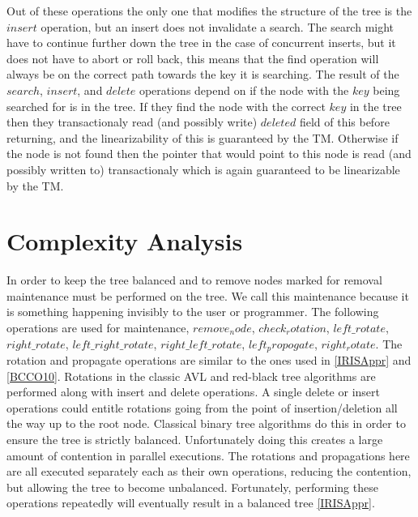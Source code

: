 \documentclass[10pt]{sigplanconf}
\begin{document}
Out of these operations the only one that modifies the structure of the tree is the $insert$ operation, but an insert does not invalidate a search.
The search might have to continue further down the tree in the case of concurrent inserts, but it does not have to abort or roll back, this means that the find operation will always be on the correct path towards the key it is searching.
The result of the $search$, $insert$, and $delete$ operations depend on if the node with the $key$ being searched for is in the tree.
If they find the node with the correct $key$ in the tree then they transactionaly read (and possibly write) $deleted$ field of this before returning, and the linearizability of this is guaranteed by the TM.
Otherwise if the node is not found then the pointer that would point to this node is read (and possibly written to) transactionaly which is again guaranteed to be linearizable by the TM.


\section{Complexity Analysis}

In order to keep the tree balanced and to remove nodes marked for removal maintenance must be performed on the tree.
We call this maintenance because it is something happening invisibly to the user or programmer.
The following operations are used for maintenance, $remove_node$, $check_rotation$, $left\_rotate$, $right\_rotate$, $left\_right\_rotate$, $right\_left\_rotate$, $left_propogate$, $right_rotate$.
The rotation and propagate operations are similar to the ones used in \ref{IRISAppr} and \ref{BCCO10}.
Rotations in the classic AVL and red-black tree algorithms are performed along with insert and delete operations.
A single delete or insert operations could entitle rotations going from the point of insertion/deletion all the way up to the root node.
Classical binary tree algorithms do this in order to ensure the tree is strictly balanced.
Unfortunately doing this creates a large amount of contention in parallel executions.
The rotations and propagations here are all executed separately each as their own operations, reducing the contention, but allowing the tree to become unbalanced.
Fortunately, performing these operations repeatedly will eventually result in a balanced tree \ref{IRISAppr}.
\end{document}
